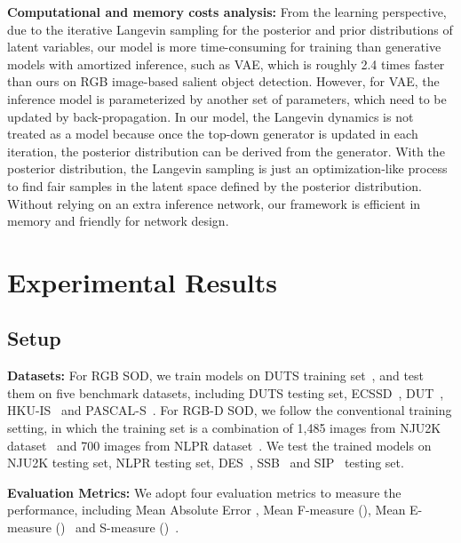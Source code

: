 \documentclass{article}
\begin{document}
\noindent\textbf{Computational and memory costs analysis:} From the learning perspective, due to the iterative Langevin sampling for the posterior and prior distributions of latent variables, our model is more time-consuming for training than generative models with amortized inference, such as VAE, which is
roughly 2.4 times faster than ours on RGB image-based salient object detection. However, for VAE, the inference model is parameterized by another set of parameters, which need to be updated by back-propagation. In our model, the Langevin dynamics is not treated as a model because once the top-down generator is updated in each iteration, the posterior distribution can be derived from the generator. With the posterior distribution, the Langevin sampling is just an optimization-like process to find fair samples in the latent space defined by the posterior distribution. Without relying on an extra inference network, our framework is efficient in memory and friendly for network design. 
















\section{Experimental Results}


\subsection{Setup}
\label{setup_sec}


\noindent\textbf{Datasets:} 
For RGB SOD, we train models on DUTS training  set~\cite{imagesaliency},
and test them on five benchmark datasets, including DUTS testing set,  ECSSD~\cite{yan2013hierarchical}, DUT~\cite{Manifold-Ranking:CVPR-2013}, HKU-IS~\cite{li2015visual} and PASCAL-S~\cite{pascal_s_dataset}.
For RGB-D SOD, we follow the conventional training setting, in which the training set is a combination of 1,485 images from NJU2K
dataset~\cite{NJU2000} and 700 images from NLPR dataset~\cite{peng2014rgbd}. We test the trained models on NJU2K testing set, NLPR testing set,
DES~\cite{cheng2014depth}, SSB~\cite{niu2012leveraging} and SIP~\cite{sip_dataset} testing set.



\noindent\textbf{Evaluation Metrics:} We adopt four evaluation metrics to measure the performance, including Mean Absolute Error , Mean F-measure (), Mean E-measure ()~\cite{fan2018enhanced} and S-measure ()~\cite{fan2017structure}.
\end{document}
